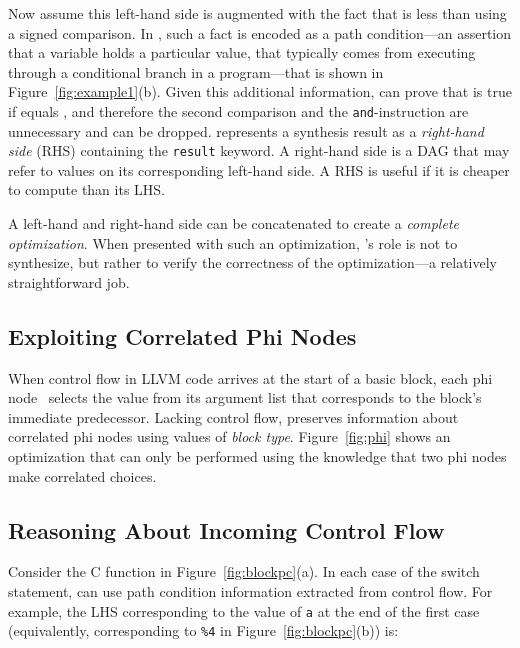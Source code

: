 Now assume this left-hand side is augmented with the fact that 
is less than  using a signed comparison.
%
In \tool{}, such a fact is encoded as a path condition---an assertion
that a variable holds a particular value, that typically comes from
executing through a conditional branch in a program---that is shown in
Figure~\ref{fig:example1}(b).
%
Given this additional information, \tool{} can prove that  is
true if  equals , and therefore the second comparison
and the \texttt{and}-instruction are unnecessary and can be dropped.
%
\tool{} represents a synthesis result as a \emph{right-hand side}
(RHS) containing the \texttt{result} keyword.
%
A right-hand side is a DAG that may refer to values on its
corresponding left-hand side.
%
A RHS is useful if it is cheaper to compute than its LHS\@.


A left-hand and right-hand side can be concatenated to create a
\emph{complete optimization}.
%
When presented with such an optimization, \tool's role is not to
synthesize, but rather to verify the correctness of the
optimization---a relatively straightforward job.


\subsection{Exploiting Correlated Phi Nodes}


When control flow in LLVM code arrives at the start of a basic block,
each phi node~\cite{Cytron91} selects the value from its argument list
that corresponds to the block's immediate predecessor.
%
Lacking control flow, \tool{} preserves information about
correlated phi nodes using values of \emph{block type}.
%
Figure~\ref{fig:phi} shows an optimization that can only be performed
using the knowledge that two phi nodes make correlated choices.



\subsection{Reasoning About Incoming Control Flow}


Consider the C function in Figure~\ref{fig:blockpc}(a).
%
In each case of the switch statement, \tool{} can use path condition
information extracted from control flow.
%
For example, the \tool{} LHS corresponding to the value of \texttt{a}
at the end of the first case (equivalently, corresponding to
\texttt{\%4} in Figure~\ref{fig:blockpc}(b)) is:

